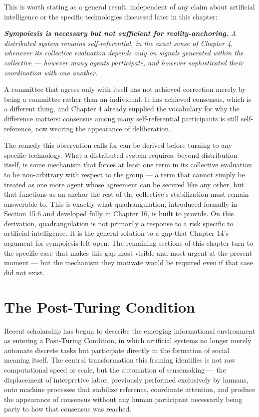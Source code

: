 \documentclass[12pt,a4paper]{book}
\renewenvironment{quotation}
  {\list{}{\leftmargin=2em\rightmargin=2em}\item[]\itshape}
  {\endlist}
\begin{document}
This is worth stating as a general result, independent of any claim about artificial intelligence or the specific technologies discussed later in this chapter:

\begin{quotation}\noindent \textbf{Sympoiesis is necessary but not sufficient for reality-anchoring.} A distributed system remains self-referential, in the exact sense of Chapter 4, whenever its collective evaluation depends only on signals generated within the collective — however many agents participate, and however sophisticated their coordination with one another.\end{quotation}

A committee that agrees only with itself has not achieved correction merely by being a committee rather than an individual. It has achieved consensus, which is a different thing, and Chapter 4 already supplied the vocabulary for why the difference matters: consensus among many self-referential participants is still self-reference, now wearing the appearance of deliberation.

The remedy this observation calls for can be derived before turning to any specific technology. What a distributed system requires, beyond distribution itself, is some mechanism that forces at least one term in its collective evaluation to be non-arbitrary with respect to the group — a term that cannot simply be treated as one more agent whose agreement can be secured like any other, but that functions as an anchor the rest of the collective's stabilization must remain answerable to. This is exactly what quadrangulation, introduced formally in Section 15.6 and developed fully in Chapter 16, is built to provide. On this derivation, quadrangulation is not primarily a response to a risk specific to artificial intelligence. It is the general solution to a gap that Chapter 14's argument for sympoiesis left open. The remaining sections of this chapter turn to the specific case that makes this gap most visible and most urgent at the present moment — but the mechanism they motivate would be required even if that case did not exist.

\section{The Post-Turing Condition}

Recent scholarship has begun to describe the emerging informational environment as entering a Post-Turing Condition, in which artificial systems no longer merely automate discrete tasks but participate directly in the formation of social meaning itself. The central transformation this framing identifies is not raw computational speed or scale, but the automation of sensemaking — the displacement of interpretive labor, previously performed exclusively by humans, onto machine processes that stabilize reference, coordinate attention, and produce the appearance of consensus without any human participant necessarily being party to how that consensus was reached.
\end{document}
